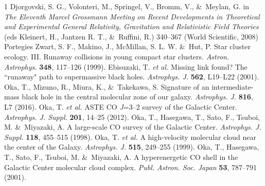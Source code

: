 \documentclass{nature}
\begin{document}
\begin{thebibliography}{1}
 Djorgovski, S. G., Volonteri, M., Springel, V., Bromm, V., \&\ Meylan, G. in {\it The Eleventh Marcel Grossmann Meeting on Recent Developments in Theoretical and Experimental General Relativity, Gravitation and Relativistic Field Theories} (eds Kleinert, H., Jantzen R. T., \&\ Ruffini, R.) 340--367 (World Scientific, 2008)
 Portegies Zwart, S. F., Makino, J., McMillan, S. L. W. \&\ Hut, P. Star cluster ecology. III. Runaway collisions in young compact star clusters. {\it Astron. Astrophys.} {\bf 348}, 117--126 (1999).
 Ebisuzaki, T. {\it et al.} Missing link found? The ``runaway" path to supermassive black holes. {\it Astrophys. J.} {\bf 562}, L19--L22 (2001).
 Oka, T., Mizuno, R., Miura, K., \&\ Takekawa, S. Signature of an intermediate-mass black hole in the central molecular zone of our galaxy. {\it Astrophys. J.} {\bf 816}, L7 (2016).
 Oka, T. {\it et al.} ASTE CO {\it J}=3--2 survey of the Galactic Center. {\it Astrophys. J. Suppl.} {\bf 201}, 14--25 (2012).
 Oka, T., Hasegawa, T., Sato, F., Tsuboi, M. \&\ Miyazaki, A. A large-scale CO survey of the Galactic Center. {\it Astrophys. J. Suppl.} {\bf 118}, 455--515 (1998).
 Oka, T. {\it et al.} A high-velocity molecular cloud near the center of the Galaxy. {\it Astrophys. J.} {\bf 515}, 249--255 (1999).
 Oka, T., Hasegawa, T., Sato, F., Tsuboi, M. \&\ Miyazaki, A. A hyperenergetic CO shell in the Galactic Center molecular cloud complex. {\it Publ. Astron. Soc. Japan} {\bf 53}, 787--791 (2001).

\end{thebibliography}
\end{document}
